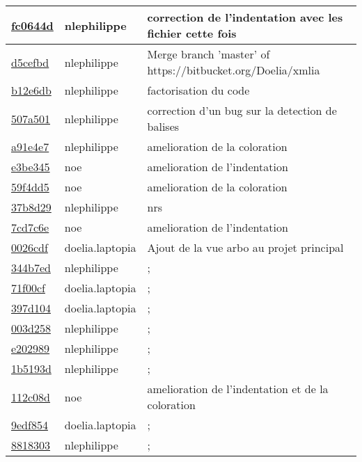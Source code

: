\begin{tabular}{l l l}
\href{fc0644dd11b71994f901d329d69cba7f4f4e789e}{fc0644d} & nlephilippe & correction de l'indentation avec les fichier cette fois\\\hline
\href{d5cefbd2a0ed80044b016bef179f736f30fb194d}{d5cefbd} & nlephilippe & Merge branch 'master' of https://bitbucket.org/Doelia/xmlia\\\hline
\href{b12e6dbe33f371d65a97f72f74dc150cc7c1591d}{b12e6db} & nlephilippe & factorisation du code\\\hline
\href{507a501210b764a641bd8055d00fe5c201409fed}{507a501} & nlephilippe & correction d'un bug sur la detection de balises\\\hline
\href{a91e4e7e1b08bf4b8927cda82cec320f6dc81bb5}{a91e4e7} & nlephilippe & amelioration de la coloration\\\hline
\href{e3be3455c2ae334128f5f201692f2b5fc8e023f0}{e3be345} & noe & amelioration de l'indentation\\\hline
\href{59f4dd5085240797b516e6488a6b2a924a72e019}{59f4dd5} & noe & amelioration de la coloration\\\hline
\href{37b8d2988ecb554f615c23c0aa8c7e786b7a7ae5}{37b8d29} & nlephilippe & nrs\\\hline
\href{7cd7c6efd5b11a2cd53d85a6a119c4e2261c306a}{7cd7c6e} & noe & amelioration de l'indentation\\\hline
\href{0026cdf34dfa461bdf8f6db41c632585ac29689e}{0026cdf} & doelia.laptopia & Ajout de la vue arbo au projet principal\\\hline
\href{344b7edb13bc30107ebf440d28295b57add9c2c6}{344b7ed} & nlephilippe & ;\\\hline
\href{71f00cf04080d5fd10a2deb237b7845f2ae8f901}{71f00cf} & doelia.laptopia & ;\\\hline
\href{397d104d84c7a632798236c12ae0c85978b4e79d}{397d104} & doelia.laptopia & ;\\\hline
\href{003d2589694df5b7c148d3a86e7f32a184a43399}{003d258} & nlephilippe & ;\\\hline
\href{e202989132d0d55d7d526390ac83a06d1bc05a19}{e202989} & nlephilippe & ;\\\hline
\href{1b5193d43a3202d04ac0abbbe6dfb7697b759d31}{1b5193d} & nlephilippe & ;\\\hline
\href{112c08dc12f1bf7fdd288de1ea3fb65f412ba00d}{112c08d} & noe & amelioration de l'indentation et de la coloration\\\hline
\href{9edf854af038d96ba66a222b4a5c3a64165d3e5c}{9edf854} & doelia.laptopia & ;\\\hline
\href{8818303e21264868387354a1692c646ac79b6673}{8818303} & nlephilippe & ;\\\hline

\end{tabular}
